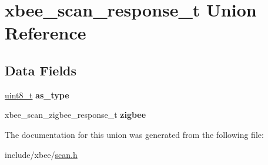 \hypertarget{unionxbee__scan__response__t}{}\section{xbee\+\_\+scan\+\_\+response\+\_\+t Union Reference}
\label{unionxbee__scan__response__t}
\subsection*{Data Fields}
\begin{DoxyCompactItemize}
\item 
\hyperlink{group__hal__dos_gae1affc9ca37cfb624959c866a73f83c2}{uint8\+\_\+t} {\bfseries as\+\_\+type}
\item 
xbee\+\_\+scan\+\_\+zigbee\+\_\+response\+\_\+t {\bfseries zigbee}
\end{DoxyCompactItemize}


The documentation for this union was generated from the following file\+:\begin{DoxyCompactItemize}
\item 
include/xbee/\hyperlink{scan_8h}{scan.\+h}\end{DoxyCompactItemize}

